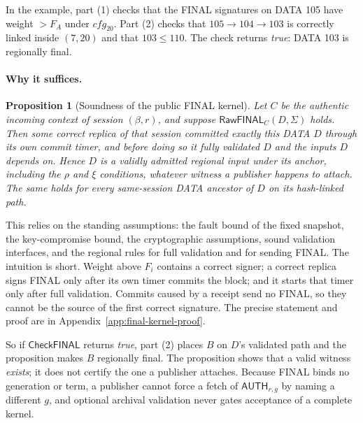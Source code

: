 \documentclass[11pt,a4paper]{article}
\newcommand{\tagg}[1]{\ensuremath{\mathsf{#1}}}
\newtheorem{proposition}[proposition]{Proposition}
\begin{document}
In the example, part (1) checks that the FINAL signatures on DATA 105
have weight $>F_A$ under $\mathit{cfg}_{20}$. Part (2) checks that
$105\to104\to103$ is correctly linked inside $(7,20)$ and that
$103\le110$. The check returns \emph{true}: DATA 103 is regionally final.

\paragraph{Why it suffices.}
\begin{proposition}[Soundness of the public FINAL kernel]
\label{prop:final-kernel-soundness}
Let $C$ be the authentic incoming context of session $(\beta,r)$, and
suppose $\tagg{RawFINAL}_C(D,\Sigma)$ holds. Then some correct replica of
that session committed exactly this DATA $D$ through its own commit
timer, and before doing so it fully validated $D$ and the inputs $D$
depends on. Hence $D$ is a validly admitted regional input under its
anchor, including the $\rho$ and $\xi$ conditions, whatever witness a
publisher happens to attach. The same holds for every same-session DATA
ancestor of $D$ on its hash-linked path.
\end{proposition}
This relies on the standing assumptions: the fault bound of the fixed
snapshot, the key-compromise bound, the cryptographic assumptions, sound
validation interfaces, and the regional rules for full validation and
for sending FINAL. The intuition is short. Weight above $F_i$ contains a
correct signer; a correct replica signs FINAL only after its own timer
commits the block; and it starts that timer only after full validation.
Commits caused by a receipt send no FINAL, so they cannot be the source
of the first correct signature. The precise statement and proof are in
Appendix~\ref{app:final-kernel-proof}.

So if $\tagg{CheckFINAL}$ returns \emph{true}, part (2) places $B$ on
$D$'s validated path and the proposition makes $B$ regionally final.
The proposition shows that a valid witness \emph{exists}; it does not
certify the one a publisher attaches. Because FINAL binds no generation
or term, a publisher cannot force a fetch of $\tagg{AUTH}_{r,g}$ by
naming a different $g$, and optional archival validation never gates
acceptance of a complete kernel.
\end{document}
